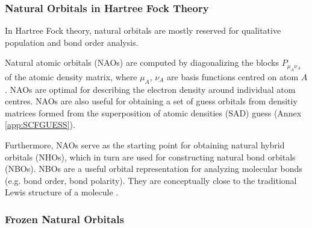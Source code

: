 

\subsubsection{Natural Orbitals in Hartree Fock Theory}

In Hartree Fock theory, natural orbitals are mostly reserved for qualitative population and bond order analysis. 

Natural atomic orbitals (NAOs) are computed by diagonalizing the blocks $P_{\mu_A\nu_A}$ of the atomic density matrix, where ${\mu_A}$, ${\nu_A}$ are basis functions centred on atom $A$. NAOs are optimal for describing the electron density around individual atom centres. NAOs are also useful for obtaining a set of guess orbitals from densitiy matrices formed from the superposition of atomic densities (SAD) guess (Annex \ref{app:SCFGUESS}). 

Furthermore, NAOs serve as the starting point for obtaining natural hybrid orbitals (NHOs), which in turn are used for constructing natural bond orbitals (NBOs). NBOs are a useful orbital representation for  analyzing molecular bonds (e.g. bond order, bond polarity). They are conceptually close to the traditional Lewis structure of a molecule \cite{Ree1983,Wei2001,Gle2011}.


\subsubsection{Frozen Natural Orbitals}

